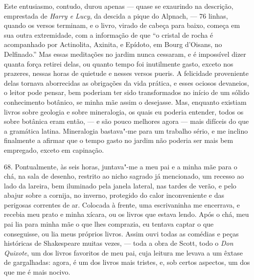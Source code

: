 \noindent{}Este entusiasmo, contudo, durou apenas --- quase se exaurindo na
descrição, emprestada de \emph{Harry e Lucy}, da descida a pique do
Alpnach, --- 76 linhas, quando os versos terminam, e o livro, virado de
cabeça para baixo, começa em sua outra extremidade, com a informação de
que ``o cristal de rocha é acompanhado por Actinolita, Axinita, e
Epídoto, em Bourg d'Oisans, no Delfinado.'' Mas essas meditações no
jardim nunca cessaram, e é impossível dizer quanta força retirei delas,
ou quanto tempo foi inutilmente gasto, exceto nos prazeres, nessas horas
de quietude e nesses versos pueris. A felicidade proveniente delas
tornava aborrecidas as obrigações da vida prática, e esses ociosos
devaneios, o leitor pode pensar, bem poderiam ter sido transformados no
início de um sólido conhecimento botânico, se minha mãe assim o
desejasse. Mas, enquanto existiam livros sobre geologia e sobre
mineralogia, os quais eu poderia entender, todos os sobre botânica eram
então, --- e são pouco melhores agora --- mais difíceis do que a gramática
latina. Mineralogia bastava"-me para um trabalho sério, e me inclino
finalmente a afirmar que o tempo gasto no jardim não poderia ser mais
bem empregado, exceto em capinação.

68. Pontualmente, às seis horas, juntava"-me a meu pai e a minha mãe para
o chá, na sala de desenho, restrito ao nicho sagrado já mencionado, um
recesso ao lado da lareira, bem iluminado pela janela lateral, nas
tardes de verão, e pelo abajur sobre a cornija, no inverno, protegido do
calor inconveniente e das perigosas correntes de ar. Colocada à frente,
uma escrivaninha me encerrava, e recebia meu prato e minha xícara, ou os
livros que estava lendo. Após o chá, meu pai lia para minha mãe o que
lhes comprazia, eu tentava captar o que conseguisse, ou lia meus
próprios livros. Assim ouvi todas as comédias e peças históricas de
Shakespeare muitas vezes, --- toda a obra de Scott, todo o \emph{Don
Quixote}, um dos livros favoritos de meu pai, cuja leitura me levava a
um êxtase de gargalhadas: agora, é um dos livros mais tristes, e, sob
certos aspectos, um dos que me é mais nocivo.

